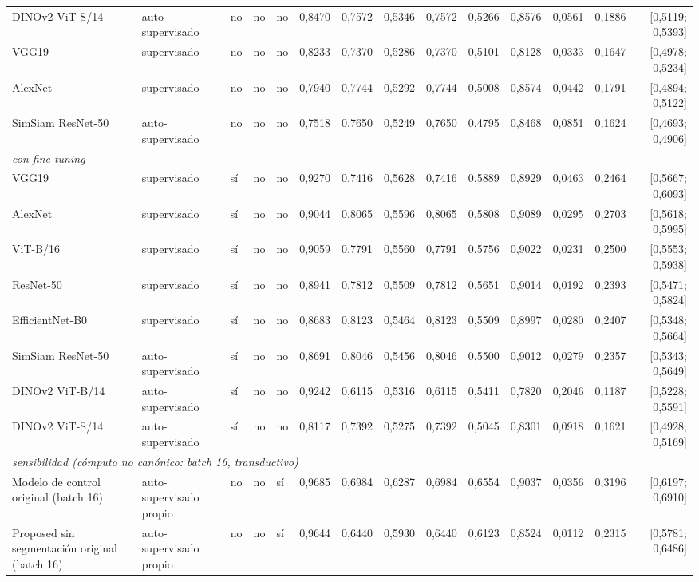 \begin{table}[ht]
\begin{tabular}{@{}lllllrrrrrrrrr@{}}
DINOv2 ViT-S/14 & auto-supervisado & no & no & no & 0,8470 & 0,7572 & 0,5346 & 0,7572 & 0,5266 & 0,8576 & 0,0561 & 0,1886 & [0,5119; 0,5393] \\
VGG19 & supervisado & no & no & no & 0,8233 & 0,7370 & 0,5286 & 0,7370 & 0,5101 & 0,8128 & 0,0333 & 0,1647 & [0,4978; 0,5234] \\
AlexNet & supervisado & no & no & no & 0,7940 & 0,7744 & 0,5292 & 0,7744 & 0,5008 & 0,8574 & 0,0442 & 0,1791 & [0,4894; 0,5122] \\
SimSiam ResNet-50 & auto-supervisado & no & no & no & 0,7518 & 0,7650 & 0,5249 & 0,7650 & 0,4795 & 0,8468 & 0,0851 & 0,1624 & [0,4693; 0,4906] \\
\midrule
\multicolumn{14}{l}{\textit{con fine-tuning}} \\
\midrule
VGG19 & supervisado & sí & no & no & 0,9270 & 0,7416 & 0,5628 & 0,7416 & 0,5889 & 0,8929 & 0,0463 & 0,2464 & [0,5667; 0,6093] \\
AlexNet & supervisado & sí & no & no & 0,9044 & 0,8065 & 0,5596 & 0,8065 & 0,5808 & 0,9089 & 0,0295 & 0,2703 & [0,5618; 0,5995] \\
ViT-B/16 & supervisado & sí & no & no & 0,9059 & 0,7791 & 0,5560 & 0,7791 & 0,5756 & 0,9022 & 0,0231 & 0,2500 & [0,5553; 0,5938] \\
ResNet-50 & supervisado & sí & no & no & 0,8941 & 0,7812 & 0,5509 & 0,7812 & 0,5651 & 0,9014 & 0,0192 & 0,2393 & [0,5471; 0,5824] \\
EfficientNet-B0 & supervisado & sí & no & no & 0,8683 & 0,8123 & 0,5464 & 0,8123 & 0,5509 & 0,8997 & 0,0280 & 0,2407 & [0,5348; 0,5664] \\
SimSiam ResNet-50 & auto-supervisado & sí & no & no & 0,8691 & 0,8046 & 0,5456 & 0,8046 & 0,5500 & 0,9012 & 0,0279 & 0,2357 & [0,5343; 0,5649] \\
DINOv2 ViT-B/14 & auto-supervisado & sí & no & no & 0,9242 & 0,6115 & 0,5316 & 0,6115 & 0,5411 & 0,7820 & 0,2046 & 0,1187 & [0,5228; 0,5591] \\
DINOv2 ViT-S/14 & auto-supervisado & sí & no & no & 0,8117 & 0,7392 & 0,5275 & 0,7392 & 0,5045 & 0,8301 & 0,0918 & 0,1621 & [0,4928; 0,5169] \\
\midrule
\multicolumn{14}{l}{\textit{sensibilidad (cómputo no canónico: batch 16, transductivo)}} \\
\midrule
Modelo de control original (batch 16) & auto-supervisado propio & no & no & sí & 0,9685 & 0,6984 & 0,6287 & 0,6984 & 0,6554 & 0,9037 & 0,0356 & 0,3196 & [0,6197; 0,6910] \\
Proposed sin segmentación original (batch 16) & auto-supervisado propio & no & no & sí & 0,9644 & 0,6440 & 0,5930 & 0,6440 & 0,6123 & 0,8524 & 0,0112 & 0,2315 & [0,5781; 0,6486] \\

\end{tabular}
\end{table}
